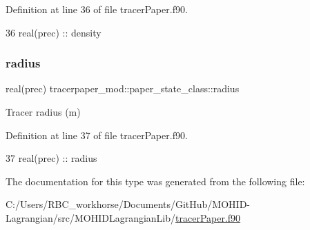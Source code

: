 Definition at line 36 of file tracer\+Paper.\+f90.


\begin{DoxyCode}
36         \textcolor{keywordtype}{real(prec)} :: density
\end{DoxyCode}
\mbox{\label{structtracerpaper__mod_1_1paper__state__class_aca8ba08eafd11071094fd7749b6bf3c7}} 
\subsubsection{\texorpdfstring{radius}{radius}}
{\footnotesize\ttfamily real(prec) tracerpaper\+\_\+mod\+::paper\+\_\+state\+\_\+class\+::radius\hspace{0.3cm}{\ttfamily [private]}}



Tracer radius (m) 



Definition at line 37 of file tracer\+Paper.\+f90.


\begin{DoxyCode}
37         \textcolor{keywordtype}{real(prec)} :: radius
\end{DoxyCode}


The documentation for this type was generated from the following file\+:\begin{DoxyCompactItemize}
\item 
C\+:/\+Users/\+R\+B\+C\+\_\+workhorse/\+Documents/\+Git\+Hub/\+M\+O\+H\+I\+D-\/\+Lagrangian/src/\+M\+O\+H\+I\+D\+Lagrangian\+Lib/\mbox{\hyperlink{tracer_paper_8f90}{tracer\+Paper.\+f90}}\end{DoxyCompactItemize}
